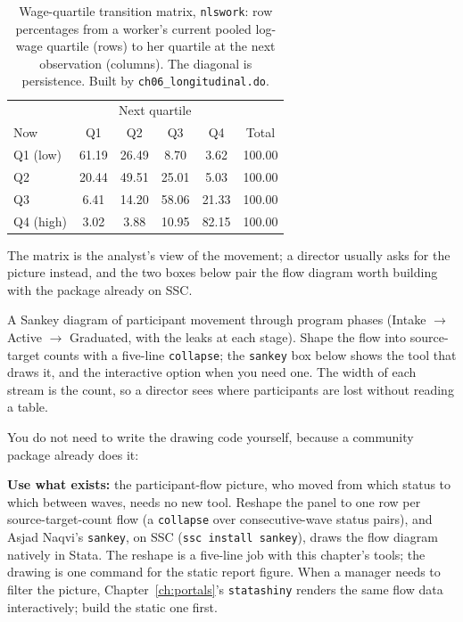 \begin{table}[htbp]
\centering
\caption[Wage-quartile transition matrix]{Wage-quartile transition matrix, \texttt{nlswork}: row percentages from a worker's current pooled log-wage quartile (rows) to her quartile at the next observation (columns). The diagonal is persistence. Built by \texttt{ch06\_longitudinal.do}.}
\label{tab:transition}
{\footnotesize
\begin{tabular}{lccccc}
\hline
             & \multicolumn{4}{c}{Next quartile} &        \\
Now          & Q1     & Q2     & Q3     & Q4     & Total  \\
\hline
Q1 (low)     & 61.19  & 26.49  &  8.70  &  3.62  & 100.00 \\
Q2           & 20.44  & 49.51  & 25.01  &  5.03  & 100.00 \\
Q3           &  6.41  & 14.20  & 58.06  & 21.33  & 100.00 \\
Q4 (high)    &  3.02  &  3.88  & 10.95  & 82.15  & 100.00 \\
\hline
\end{tabular}
}
\end{table}

The matrix is the analyst's view of the movement; a director usually asks for the picture instead, and the two boxes below pair the flow diagram worth building with the package already on SSC.

\begin{vizcallout}
A Sankey diagram of participant movement through program phases (Intake $\rightarrow$ Active $\rightarrow$ Graduated, with the leaks at each stage). Shape the flow into source-target counts with a five-line \texttt{collapse}; the \texttt{sankey} box below shows the tool that draws it, and the interactive option when you need one. The width of each stream is the count, so a director sees where participants are lost without reading a table.
\end{vizcallout}

You do not need to write the drawing code yourself, because a community package already does it:

\begin{kaobox}[frametitle=Existing tool: \texttt{sankey} for participant-flow pictures]
\textbf{Use what exists:} the participant-flow picture, who moved from which status to which between waves, needs no new tool. Reshape the panel to one row per source-target-count flow (a \texttt{collapse} over consecutive-wave status pairs), and Asjad Naqvi's \texttt{sankey}, on SSC (\texttt{ssc install sankey}), draws the flow diagram natively in Stata. The reshape is a five-line job with this chapter's tools; the drawing is one command for the static report figure. When a manager needs to filter the picture, Chapter~\ref{ch:portals}'s \texttt{statashiny} renders the same flow data interactively; build the static one first.
\end{kaobox}

